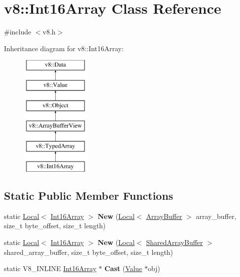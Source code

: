 \hypertarget{classv8_1_1Int16Array}{}\section{v8\+:\+:Int16\+Array Class Reference}
\label{classv8_1_1Int16Array}


{\ttfamily \#include $<$v8.\+h$>$}

Inheritance diagram for v8\+:\+:Int16\+Array\+:\begin{figure}[H]
\begin{center}
\leavevmode
\includegraphics[height=6.000000cm]{classv8_1_1Int16Array}
\end{center}
\end{figure}
\subsection*{Static Public Member Functions}
\begin{DoxyCompactItemize}
\item 
\hypertarget{classv8_1_1Int16Array_a6e102d644c3f96345bcf212673b96090}{}static \hyperlink{classv8_1_1Local}{Local}$<$ \hyperlink{classv8_1_1Int16Array}{Int16\+Array} $>$ {\bfseries New} (\hyperlink{classv8_1_1Local}{Local}$<$ \hyperlink{classv8_1_1ArrayBuffer}{Array\+Buffer} $>$ array\+\_\+buffer, size\+\_\+t byte\+\_\+offset, size\+\_\+t length)\label{classv8_1_1Int16Array_a6e102d644c3f96345bcf212673b96090}

\item 
\hypertarget{classv8_1_1Int16Array_a9634021f52042c976091549358731432}{}static \hyperlink{classv8_1_1Local}{Local}$<$ \hyperlink{classv8_1_1Int16Array}{Int16\+Array} $>$ {\bfseries New} (\hyperlink{classv8_1_1Local}{Local}$<$ \hyperlink{classv8_1_1SharedArrayBuffer}{Shared\+Array\+Buffer} $>$ shared\+\_\+array\+\_\+buffer, size\+\_\+t byte\+\_\+offset, size\+\_\+t length)\label{classv8_1_1Int16Array_a9634021f52042c976091549358731432}

\item 
\hypertarget{classv8_1_1Int16Array_abef12f11ace9c74a4ce451db28b954e5}{}static V8\+\_\+\+I\+N\+L\+I\+N\+E \hyperlink{classv8_1_1Int16Array}{Int16\+Array} $\ast$ {\bfseries Cast} (\hyperlink{classv8_1_1Value}{Value} $\ast$obj)\label{classv8_1_1Int16Array_abef12f11ace9c74a4ce451db28b954e5}

\end{DoxyCompactItemize}
